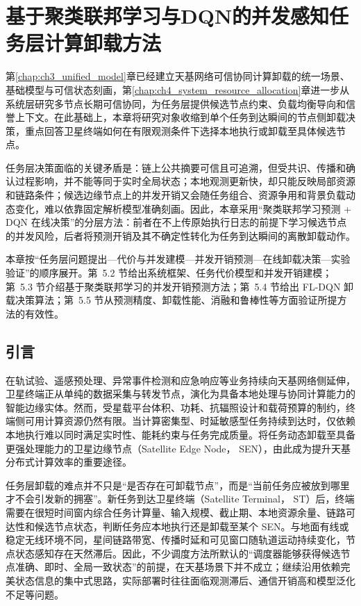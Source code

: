 \chapter{基于聚类联邦学习与DQN的并发感知任务层计算卸载方法}
\label{chap:ch5_task_offloading}


第\ref{chap:ch3_unified_model}章已经建立天基网络可信协同计算卸载的统一场景、基础模型与可信状态刻画，第\ref{chap:ch4_system_resource_allocation}章进一步从系统层研究多节点长期可信协同，为任务层提供候选节点约束、负载均衡导向和信誉上下文。在此基础上，本章将研究对象收缩到单个任务到达瞬间的节点侧卸载决策，重点回答卫星终端如何在有限观测条件下选择本地执行或卸载至具体候选节点。

任务层决策面临的关键矛盾是：链上公共摘要可信且可追溯，但受共识、传播和确认过程影响，并不能等同于实时全局状态；本地观测更新快，却只能反映局部资源和链路条件；候选边缘节点上的并发开销又会随任务组合、资源争用和背景负载动态变化，难以依靠固定解析模型准确刻画。因此，本章采用“聚类联邦学习预测 + DQN 在线决策”的分层方法：前者在不上传原始执行日志的前提下学习候选节点的并发风险，后者将预测开销及其不确定性转化为任务到达瞬间的离散卸载动作。

本章按“任务层问题提出—代价与并发建模—并发开销预测—在线卸载决策—实验验证”的顺序展开。第~5.2 节给出系统框架、任务代价模型和并发开销建模；第~5.3 节介绍基于聚类联邦学习的并发开销预测方法；第~5.4 节给出 FL-DQN 卸载决策算法；第~5.5 节从预测精度、卸载性能、消融和鲁棒性等方面验证所提方法的有效性。

\section{引言}
\label{sec:ch5_problem_statement}


在轨试验、遥感预处理、异常事件检测和应急响应等业务持续向天基网络侧延伸，卫星终端正从单纯的数据采集与转发节点，演化为具备本地处理与协同计算能力的智能边缘实体。然而，受星载平台体积、功耗、抗辐照设计和载荷预算的制约，终端侧可用计算资源仍然有限。当计算密集型、时延敏感型任务持续到达时，仅依赖本地执行难以同时满足实时性、能耗约束与任务完成质量。将任务动态卸载至具备更强处理能力的卫星边缘节点（Satellite Edge Node， SEN），由此成为提升天基分布式计算效率的重要途径。

任务层卸载的难点并不只是“是否存在可卸载节点”，而是“当前任务应被放到哪里才不会引发新的拥塞”。新任务到达卫星终端（Satellite Terminal， ST）后，终端需要在很短时间窗内综合任务计算量、输入规模、截止期、本地资源余量、链路可达性和候选节点状态，判断任务应本地执行还是卸载至某个 SEN。与地面有线或稳定无线环境不同，星间链路带宽、传播时延和可见窗口随轨道运动持续变化，节点状态感知存在天然滞后。因此，不少调度方法所默认的“调度器能够获得候选节点准确、即时、全局一致状态”的前提，在天基场景下并不成立；继续沿用依赖完美状态信息的集中式思路，实际部署时往往面临观测滞后、通信开销高和模型泛化不足等问题。

